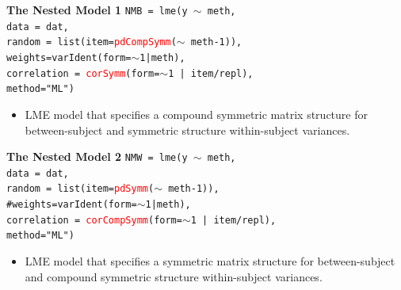 \documentclass[compress]{beamer}        %
\makeatletter
\newcommand{\tcb}{\textcolor{beamer@blendedblue}}
\newcommand{\tcr}{\textcolor{red}}
\makeatother
\begin{document}
		\begin{frame}[fragile]{\bf \tcb{The Nested Model 1}}
			\texttt{NMB = lme(y $\sim$ meth,\\
				\hspace{0.6cm} data = dat,\\
				\hspace{0.6cm} random = list(item=\tcr{pdCompSymm}($\sim$ meth-1)), \\
				\hspace{0.6cm} weights=varIdent(form=$\sim$1|meth),\\
				\hspace{0.6cm} correlation = \tcr{corSymm}(form=$\sim$1 | item/repl),\\
				\hspace{0.6cm} method="ML")}
			
			\begin{itemize}
				\item LME model that specifies a compound symmetric matrix structure for between-subject and symmetric structure within-subject variances.
			\end{itemize}
			
		\end{frame}
		\begin{frame}[fragile]{\bf \tcb{The Nested Model 2}}
			\texttt{NMW = lme(y $\sim$ meth,\\
				\hspace{0.6cm} data = dat,\\
				\hspace{0.6cm} random = list(item=\tcr{pdSymm}($\sim$ meth-1)), \\
				\hspace{0.6cm} \tcb{\#weights=varIdent(form=$\sim$1|meth),}\\
				\hspace{0.6cm} correlation = \tcr{corCompSymm}(form=$\sim$1 | item/repl),\\
				\hspace{0.6cm} method="ML")}
			\begin{itemize}
				\item LME model that specifies a symmetric matrix structure for between-subject and compound symmetric structure within-subject variances.
			\end{itemize}
		\end{frame}
		
\end{document}
